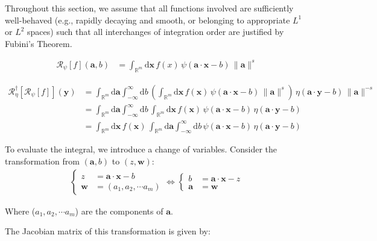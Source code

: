 \documentclass[a4paper,12pt]{article}
\newcommand{\intinf}{\int_{-\infty}^{\infty}}
\newcommand{\intrm}{\int_{\mathbb{R}^m}}
\newcommand{\Rid}{\mathscr{R}}
\newcommand{\Ridd}{\mathscr{R}^{\dagger}}
\newcommand{\va}{\bm{a}}
\newcommand{\vx}{\bm{x}}
\newcommand{\vy}{\bm{y}}
\newcommand{\vw}{\bm{w}}
\newcommand{\nora}{\|\bm{a}\|}
\newcommand{\da}{\mathrm{d}\va}
\newcommand{\dx}{\mathrm{d}\vx}
\newcommand{\db}{\mathrm{d}b}
\begin{document}
Throughout this section, 
we assume that all functions involved are sufficiently well-behaved (e.g., rapidly decaying and smooth, or belonging to appropriate $L^1$ or $L^2$ spaces) such that all interchanges of integration order are justified by Fubini's Theorem.

\begin{align}
  \Rid_\psi[f](\va, b) &= \intrm \dx \, f(x) \, \psi(\va \cdot \vx - b) \, \nora^s 
\end{align}

\begin{align}
  \Ridd_{\eta}[\Rid_\psi[f]](\vy) &= \intrm \da \intinf \db \, \left(\intrm \dx \, f(\vx) \, \psi(\va \cdot \vx - b) \, \nora^s \right)  \, \eta(\va \cdot \vy - b) \, \nora^{-s}\\
  &= \intrm \da \intinf \db \, \intrm \dx \, f(\vx) \, \psi(\va \cdot \vx - b) \, \eta(\va \cdot \vy - b) \label{a}\\
  &= \intrm \dx \, f(\vx) \, \intrm \da \intinf \db \, \psi(\va \cdot \vx - b) \, \eta(\va \cdot \vy - b) \label{b}
\end{align}

To evaluate the integral, we introduce a change of variables. Consider the transformation from $(\va, b)$ to $(z, \vw)$:
\begin{align*}
  \begin{cases}
    z &= \va \cdot \vx - b\\
    \vw &= (a_1, a_2, \cdots a_m)
  \end{cases}
  \iff
  \begin{cases}
    b &= \va \cdot \vx - z\\
    \va &= \vw 
  \end{cases}
\end{align*}

Where ($a_1, a_2, \cdots a_m$) are the components of $\va$.

\clearpage

The Jacobian matrix of this transformation is given by:
\end{document}
